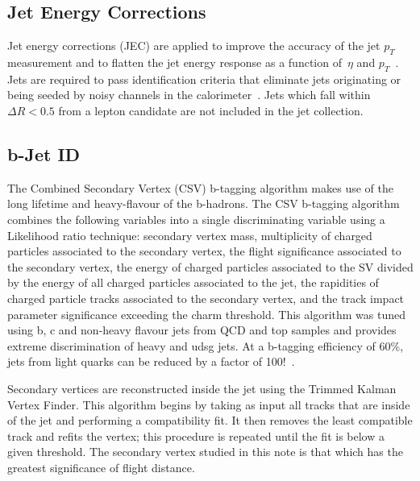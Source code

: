 \subsection{Jet Energy Corrections}
Jet energy corrections (JEC)
are applied to improve the accuracy of the jet $p_{T}$ measurement
and to flatten the jet energy response as a function
of~$\eta$ and $p_{T}$~\cite{jme-10-010}.
Jets are required to pass identification
criteria that eliminate jets originating or being seeded by
noisy channels in the calorimeter~\cite{Chatrchyan:2009hy}.
Jets which fall within $\Delta R < 0.5$ from a lepton candidate
are not included in the jet collection.

\subsection{b-Jet ID}
The Combined Secondary Vertex (CSV) b-tagging algorithm makes use
of the long lifetime and heavy-flavour of the b-hadrons.
The CSV b-tagging algorithm combines the following variables into a single discriminating
variable using a Likelihood ratio technique: secondary vertex mass, multiplicity of charged
particles associated to the secondary vertex, the flight significance associated to the
secondary vertex, the energy of charged particles associated to the SV divided by the energy
of all charged particles associated to the jet, the rapidities of charged particle tracks associated
to the secondary vertex, and the track impact parameter significance exceeding the charm threshold.
This algorithm was tuned
using b, c and non-heavy flavour jets from QCD and top samples and provides extreme discrimination
of heavy and udsg jets. At a b-tagging efficiency of 60$\%$, jets from light quarks can be reduced
by a factor of 100!~\cite{refCSV}.

Secondary vertices are reconstructed inside the jet using the Trimmed Kalman Vertex Finder.
This algorithm begins by taking as input all tracks that are inside of the jet and performing a compatibility fit. It then removes the least compatible track and refits the vertex; this procedure is repeated until
the fit is below a given threshold. The secondary vertex studied in this note is that which has
the greatest significance of flight distance.

